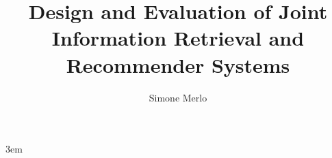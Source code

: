 \documentclass{DEIThesis}
\title{Design and Evaluation of Joint Information Retrieval and Recommender Systems}
\author{Simone Merlo}
\begin{document}
\emergencystretch 3em
    \frontmatter

    \mainmatter
    
    
    
    
    
    
    
    
    \backmatter
\end{document}
